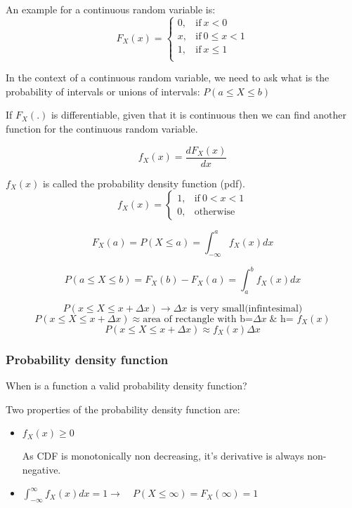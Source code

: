 \documentclass{article}
\begin{document}
An example for a continuous random variable is:
\begin{equation*}
    F_X (x)=
    \begin{cases}
      0, & \text{if}\ x < 0 \\
      x, & \text{if}\ 0 \leq x < 1 \\
      1, & \text{if}\ x\leq 1  \\
    \end{cases}
\end{equation*}

In the context of a continuous random variable, we need to ask what is the probability of intervals or unions of intervals: $ P(a \leq X \leq b)$

If $F_X(.)$ is differentiable, given that it is continuous then we can find another function for the continuous random variable.

$$ f_X(x)= \frac{dF_X(x)}{dx}$$

$f_X(x)$ is called the probability density function (pdf).
\begin{equation*}
    f_X (x)=
    \begin{cases}
      1, & \text{if}\ 0 < x < 1 \\
      0, & \text{otherwise}\
    \end{cases}
\end{equation*}

$$ F_X(a)= P(X \leq a)= \int_{-\infty}^{a}f_X(x)dx$$

$$  P(a \leq X \leq b)=F_X(b)-F_X(a) = \int_{a}^{b}f_X(x)dx$$

$$ P(x \leq X \leq x + \Delta x) \to \Delta x\text{ is very small(infintesimal)}$$
$$ P(x \leq X \leq x + \Delta x) \approx \text{area of rectangle with b=} \Delta x \;\& \text{ h= }f_X(x)$$
$$ P(x \leq X \leq x + \Delta x) \approx f_X(x) \Delta x$$

\subsubsection{Probability density function}
When is a function a valid probability density function?

Two properties of the probability density function are:
\begin{itemize}
    \item $f_X(x) \geq 0$

    As CDF is monotonically non decreasing, it's derivative is always non-negative.
    \item $ \int_{-\infty}^{\infty}f_X(x)dx= 1 \to \quad P(X \leq \infty )= F_X(\infty)=1$
\end{itemize}
\end{document}

